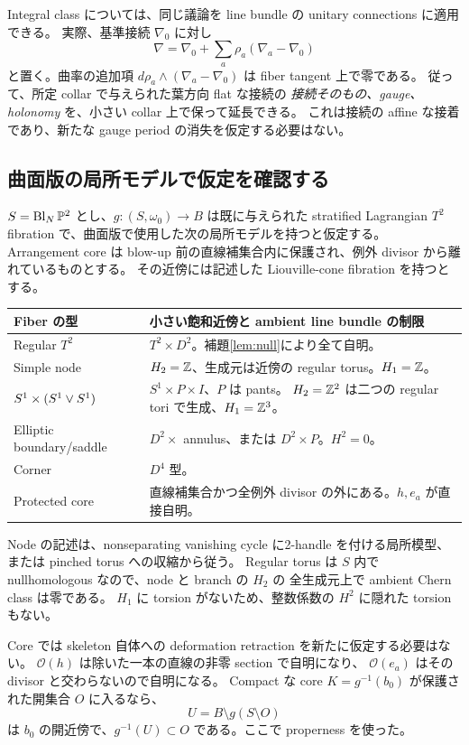 Integral class については、同じ議論を line bundle の unitary connections に適用できる。
実際、基準接続 $\nabla_0$ に対し
\[
\nabla=\nabla_0+\sum_a\rho_a(\nabla_a-\nabla_0)
\]
と置く。曲率の追加項 $d\rho_a\wedge(\nabla_a-\nabla_0)$ は fiber tangent 上で零である。
従って、所定 collar で与えられた葉方向 flat な接続の
\emph{接続そのもの、gauge、holonomy} を、小さい collar 上で保って延長できる。
これは接続の affine な接着であり、新たな gauge period の消失を仮定する必要はない。

\subsection{曲面版の局所モデルで仮定を確認する}

$S=\operatorname{Bl}_N\mathbb P^2$ とし、$g:(S,\omega_0)\to B$ は既に与えられた stratified
Lagrangian $T^2$ fibration で、曲面版で使用した次の局所モデルを持つと仮定する。
Arrangement core は blow-up 前の直線補集合内に保護され、例外 divisor から離れているものとする。
その近傍には記述した Liouville-cone fibration を持つとする。

\begin{center}
\begin{tabularx}{\linewidth}{@{}lX@{}}
\toprule
Fiber の型 & 小さい飽和近傍と ambient line bundle の制限\\
\midrule
Regular $T^2$ & $T^2\times D^2$。補題\ref{lem:null}により全て自明。\\
Simple node & $H_2=\mathbb Z$、生成元は近傍の regular torus。$H_1=\mathbb Z$。\\
$S^1\times(S^1\vee S^1)$ & $S^1\times P\times I$、$P$ は pants。
$H_2=\mathbb Z^2$ は二つの regular tori で生成、$H_1=\mathbb Z^3$。\\
Elliptic boundary/saddle & $D^2\times$ annulus、または $D^2\times P$。$H^2=0$。\\
Corner & $D^4$ 型。\\
Protected core & 直線補集合かつ全例外 divisor の外にある。$h,e_a$ が直接自明。\\
\bottomrule
\end{tabularx}
\end{center}

Node の記述は、nonseparating vanishing cycle に2-handle を付ける局所模型、
または pinched torus への収縮から従う\cite[Sections 4.2, 8.1]{symington}。
Regular torus は $S$ 内で nullhomologous なので、node と branch の $H_2$ の
全生成元上で ambient Chern class は零である。
$H_1$ に torsion がないため、整数係数の $H^2$ に隠れた torsion もない。

Core では skeleton 自体への deformation retraction を新たに仮定する必要はない。
$\mathcal O(h)$ は除いた一本の直線の非零 section で自明になり、
$\mathcal O(e_a)$ はその divisor と交わらないので自明になる。
Compact な core $K=g^{-1}(b_0)$ が保護された開集合 $O$ に入るなら、
\[
U=B\setminus g(S\setminus O)
\]
は $b_0$ の開近傍で、$g^{-1}(U)\subset O$ である。ここで properness を使った。


